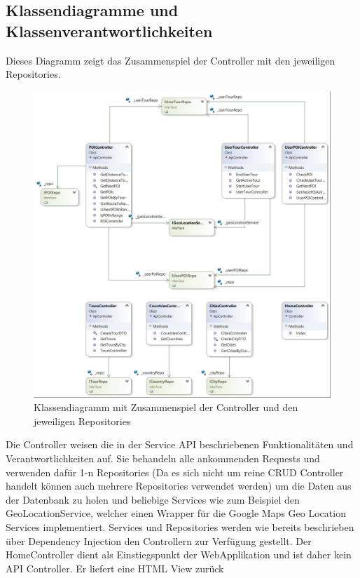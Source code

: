 \documentclass[a4paper,10pt,xetex]{article}
\begin{document}
\bigskip


\bigskip

\clearpage
\bigskip

\subsection[Klassendiagramme und Klassenverantwortlichkeiten]{ Klassendiagramme und Klassenverantwortlichkeiten}

  Dieses Diagramm zeigt das Zusammenspiel der Controller mit den jeweiligen Repositories.


\bigskip

\begin{figure}
  \centering
  \includegraphics{klassendiagramm_backend1}
  \caption{Klassendiagramm mit Zusammenspiel der Controller und den jeweiligen Repositories}
\end{figure}




  Die Controller weisen die in der Service API beschriebenen Funktionalit\"aten und Verantwortlichkeiten auf. Sie
  behandeln alle ankommenden Requests und verwenden daf\"ur 1-n Repositories (Da es sich nicht um reine CRUD Controller
  handelt k\"onnen auch mehrere Repositories verwendet werden) um die Daten aus der Datenbank zu holen und beliebige
  Services wie zum Beispiel den GeoLocationService, welcher einen Wrapper f\"ur die Google Maps Geo Location Services
  implementiert. Services und Repositories werden wie bereits beschrieben \"uber Dependency Injection den Controllern zur
  Verf\"ugung gestellt. Der HomeController dient als Einstiegspunkt der WebApplikation und ist daher kein API Controller.
  Er liefert eine HTML View zur\"uck
\end{document}
